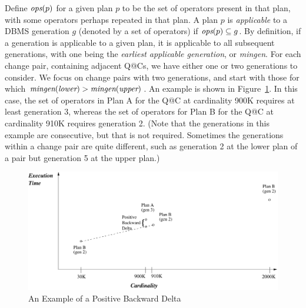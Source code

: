 \documentclass[prodmode,acmtods]{acmsmall}
\begin{document}
Define $\hbox{\em ops}(p)$ for a given plan $p$ to be the set of operators
present in that plan, with some operators perhaps repeated in that plan. 
A plan $p$ is {\em applicable} to a DBMS generation $g$ (denoted by a set of
operators) if $\hbox{\em ops}(p) \subseteq g$. By
definition, if a generation is applicable to a given plan, it is
applicable to all subsequent generations, with one being the 
{\em earliest applicable generation}, or {\em mingen}.
For each change pair, containing adjacent Q@Cs, we have either one or two
generations to consider. We focus on change pairs with two generations, and start with
those for which $\hbox{\em 
mingen}(\hbox{\em lower}) > \hbox{\em mingen}(\hbox{\em
  upper})$. An example is shown in Figure~\ref{fig:posback}. In this case,
the set of operators in Plan A for the Q@C at cardinality 900K requires at
least generation 3, whereas the set of operators for Plan B for the Q@C at
cardinality 910K requires generation 2. (Note that the generations in
this example
are consecutive, but that is not required. Sometimes the generations within a
change pair are quite different, such as generation 2 at the lower plan of a
pair but generation 5 at the upper plan.)

\begin{figure}[t]
\includegraphics[width=30pc]{figures/posback.pdf}
\caption{An Example of a Positive Backward Delta\label{fig:posback}}
\end{figure}
\end{document}
